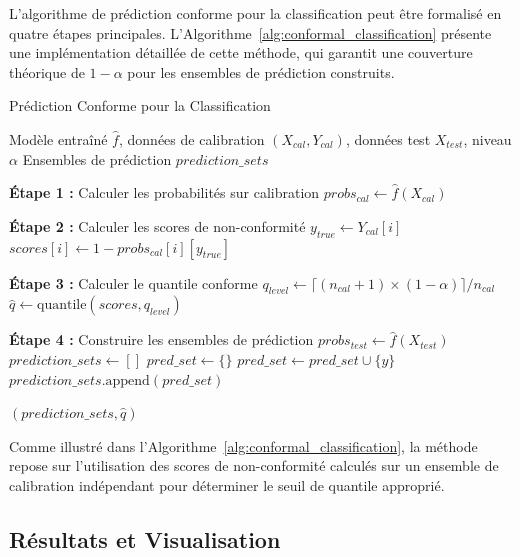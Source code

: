 \documentclass[a4paper,12pt]{article}
\begin{document}
L'algorithme de prédiction conforme pour la classification peut être formalisé en quatre étapes principales. L'Algorithme~\ref{alg:conformal_classification} présente une implémentation détaillée de cette méthode, qui garantit une couverture théorique de $1-\alpha$ pour les ensembles de prédiction construits.

\begin{algorithm}
\caption{Prédiction Conforme pour la Classification}
\label{alg:conformal_classification}
\begin{algorithmic}[1]
\REQUIRE Modèle entraîné $\hat{f}$, données de calibration $(X_{cal}, Y_{cal})$, données test $X_{test}$, niveau $\alpha$
\ENSURE Ensembles de prédiction $prediction\_sets$

\STATE \textbf{Étape 1 :} Calculer les probabilités sur calibration
\STATE $probs_{cal} \leftarrow \hat{f}(X_{cal})$ 

\STATE \textbf{Étape 2 :} Calculer les scores de non-conformité
    \STATE $y_{true} \leftarrow Y_{cal}[i]$
    \STATE $scores[i] \leftarrow 1 - probs_{cal}[i][y_{true}]$
\ENDFOR

\STATE \textbf{Étape 3 :} Calculer le quantile conforme
\STATE $q_{level} \leftarrow \lceil (n_{cal} + 1) \times (1 - \alpha) \rceil / n_{cal}$
\STATE $\hat{q} \leftarrow \text{quantile}(scores, q_{level})$

\STATE \textbf{Étape 4 :} Construire les ensembles de prédiction
\STATE $probs_{test} \leftarrow \hat{f}(X_{test})$
\STATE $prediction\_sets \leftarrow []$
    \STATE $pred\_set \leftarrow \{\}$
            \STATE $pred\_set \leftarrow pred\_set \cup \{y\}$
        \ENDIF
    \ENDFOR
    \STATE $prediction\_sets.\text{append}(pred\_set)$
\ENDFOR

\RETURN $(prediction\_sets, \hat{q})$
\end{algorithmic}
\end{algorithm}

Comme illustré dans l'Algorithme~\ref{alg:conformal_classification}, la méthode repose sur l'utilisation des scores de non-conformité calculés sur un ensemble de calibration indépendant pour déterminer le seuil de quantile approprié.

\subsection{Résultats et Visualisation}
\end{document}
